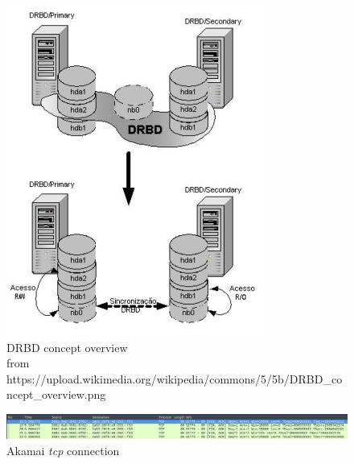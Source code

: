 \documentclass[conference]{IEEEtran}
\begin{document}
\begin{figure}[ht!]
  \includegraphics[width=\linewidth]{DRBD.png}
  \caption{DRBD concept overview \\ from https://upload.wikimedia.org/wikipedia/commons/5/5b/DRBD\_concept\_overview.png}
\end{figure}

\begin{figure}[ht!]
  \includegraphics[width=\linewidth]{tcp.png}
  \caption{Akamai \textit{tcp} connection}
\end{figure}
\end{document}
